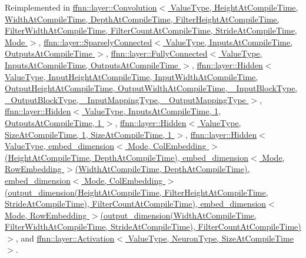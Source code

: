 Reimplemented in \hyperlink{classffnn_1_1layer_1_1_convolution_af079973fdb795f4ccd902a00c4d96d3b}{ffnn\-::layer\-::\-Convolution$<$ Value\-Type, Height\-At\-Compile\-Time, Width\-At\-Compile\-Time, Depth\-At\-Compile\-Time, Filter\-Height\-At\-Compile\-Time, Filter\-Width\-At\-Compile\-Time, Filter\-Count\-At\-Compile\-Time, Stride\-At\-Compile\-Time, Mode $>$}, \hyperlink{classffnn_1_1layer_1_1_sparsely_connected_a597ea83c83e8f4f64a1fb7f17a1ea015}{ffnn\-::layer\-::\-Sparsely\-Connected$<$ Value\-Type, Inputs\-At\-Compile\-Time, Outputs\-At\-Compile\-Time $>$}, \hyperlink{classffnn_1_1layer_1_1_fully_connected_afd5c1a006cf33a47cb7e2a982fe4cd6d}{ffnn\-::layer\-::\-Fully\-Connected$<$ Value\-Type, Inputs\-At\-Compile\-Time, Outputs\-At\-Compile\-Time $>$}, \hyperlink{classffnn_1_1layer_1_1_hidden_a246152dfed00bbacb94fbbd6712acea0}{ffnn\-::layer\-::\-Hidden$<$ Value\-Type, Input\-Height\-At\-Compile\-Time, Input\-Width\-At\-Compile\-Time, Output\-Height\-At\-Compile\-Time, Output\-Width\-At\-Compile\-Time, \-\_\-\-Input\-Block\-Type, \-\_\-\-Output\-Block\-Type, \-\_\-\-Input\-Mapping\-Type, \-\_\-\-Output\-Mapping\-Type $>$}, \hyperlink{classffnn_1_1layer_1_1_hidden_a246152dfed00bbacb94fbbd6712acea0}{ffnn\-::layer\-::\-Hidden$<$ Value\-Type, Inputs\-At\-Compile\-Time, 1, Outputs\-At\-Compile\-Time, 1 $>$}, \hyperlink{classffnn_1_1layer_1_1_hidden_a246152dfed00bbacb94fbbd6712acea0}{ffnn\-::layer\-::\-Hidden$<$ Value\-Type, Size\-At\-Compile\-Time, 1, Size\-At\-Compile\-Time, 1 $>$}, \hyperlink{classffnn_1_1layer_1_1_hidden_a246152dfed00bbacb94fbbd6712acea0}{ffnn\-::layer\-::\-Hidden$<$ Value\-Type, embed\-\_\-dimension$<$ Mode, Col\-Embedding $>$(\-Height\-At\-Compile\-Time, Depth\-At\-Compile\-Time), embed\-\_\-dimension$<$ Mode, Row\-Embedding $>$(\-Width\-At\-Compile\-Time, Depth\-At\-Compile\-Time), embed\-\_\-dimension$<$ Mode, Col\-Embedding $>$(output\-\_\-dimension(\-Height\-At\-Compile\-Time, Filter\-Height\-At\-Compile\-Time, Stride\-At\-Compile\-Time), Filter\-Count\-At\-Compile\-Time), embed\-\_\-dimension$<$ Mode, Row\-Embedding $>$(output\-\_\-dimension(\-Width\-At\-Compile\-Time, Filter\-Width\-At\-Compile\-Time, Stride\-At\-Compile\-Time), Filter\-Count\-At\-Compile\-Time)$>$}, and \hyperlink{classffnn_1_1layer_1_1_activation_a3c4284245343f2132dd28eaf7ffbed47}{ffnn\-::layer\-::\-Activation$<$ Value\-Type, Neuron\-Type, Size\-At\-Compile\-Time $>$}.

